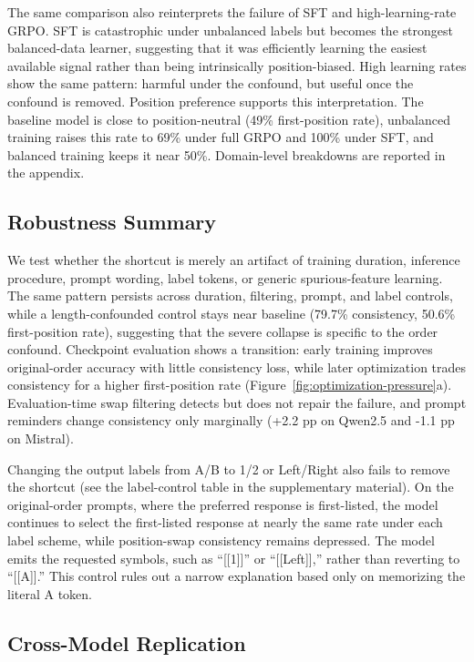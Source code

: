 \documentclass[letterpaper]{article}
\begin{document}
The same comparison also reinterprets the failure of SFT and high-learning-rate GRPO. SFT is catastrophic under unbalanced labels but becomes the strongest balanced-data learner, suggesting that it was efficiently learning the easiest available signal rather than being intrinsically position-biased. High learning rates show the same pattern: harmful under the confound, but useful once the confound is removed. Position preference supports this interpretation. The baseline model is close to position-neutral (49\% first-position rate), unbalanced training raises this rate to 69\% under full GRPO and 100\% under SFT, and balanced training keeps it near 50\%. Domain-level breakdowns are reported in the appendix.

\subsection{Robustness Summary}

We test whether the shortcut is merely an artifact of training duration, inference procedure, prompt wording, label tokens, or generic spurious-feature learning. The same pattern persists across duration, filtering, prompt, and label controls, while a length-confounded control stays near baseline (79.7\% consistency, 50.6\% first-position rate), suggesting that the severe collapse is specific to the order confound. Checkpoint evaluation shows a transition: early training improves original-order accuracy with little consistency loss, while later optimization trades consistency for a higher first-position rate (Figure~\ref{fig:optimization-pressure}a). Evaluation-time swap filtering detects but does not repair the failure, and prompt reminders change consistency only marginally (+2.2 pp on Qwen2.5 and -1.1 pp on Mistral).

Changing the output labels from A/B to 1/2 or Left/Right also fails to remove the shortcut (see the label-control table in the supplementary material). On the original-order prompts, where the preferred response is first-listed, the model continues to select the first-listed response at nearly the same rate under each label scheme, while position-swap consistency remains depressed. The model emits the requested symbols, such as ``[[1]]'' or ``[[Left]],'' rather than reverting to ``[[A]].'' This control rules out a narrow explanation based only on memorizing the literal A token.

\subsection{Cross-Model Replication}
\end{document}
